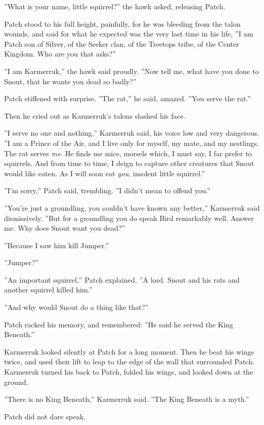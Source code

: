 \documentclass[12pt]{book}
\begin{document}
 ''What is your name, little squirrel?'' the hawk asked, releasing Patch.\par
 Patch stood to his full height, painfully, for he was bleeding from the talon wounds, and said for what he expected was the very last time in his life, ''I am Patch son of Silver, of the Seeker clan, of the Treetops tribe, of the Center Kingdom. Who are you that asks?''\par
 ''I am Karmerruk,'' the hawk said proudly. ''Now tell me, what have you done to Snout, that he wants you dead so badly?''\par
 Patch stiffened with surprise. ''The rat,'' he said, amazed. ''You serve the rat.''\par
 Then he cried out as Karmerruk's talons slashed his face.\par
 ''I serve no one and nothing,'' Karmerruk said, his voice low and very dangerous. ''I am a Prince of the Air, and I live only for myself, my mate, and my nestlings. The rat serves {\it me}. He finds me mice, morsels which, I must say, I far prefer to squirrels. And from time to time, I deign to capture other creatures that Snout would like eaten. As I will soon eat {\it you}, insolent little squirrel.''\par
 ''I'm sorry,'' Patch said, trembling. ''I didn't mean to offend you.''\par
 ''You're just a groundling, you couldn't have known any better,'' Karmerruk said dismissively. ''But for a groundling you do speak Bird remarkably well. Answer me. Why does Snout want you dead?''\par
 ''Because I saw him kill Jumper.''\par
''Jumper?''\par
''An important squirrel,'' Patch explained. ''A lord. Snout and his rats and another squirrel killed him.''\par
 ''And why would Snout do a thing like that?''\par
 Patch racked his memory, and remembered: ''He said he served the King Beneath.''\par
 Karmerruk looked silently at Patch for a long moment. Then he beat his wings twice, and used their lift to leap to the edge of the wall that surrounded Patch. Karmerruk turned his back to Patch, folded his wings, and looked down at the ground.\par
 ''There is no King Beneath,'' Karmerruk said. ''The King Beneath is a myth.''\par
 Patch did not dare speak.\par
\end{document}

